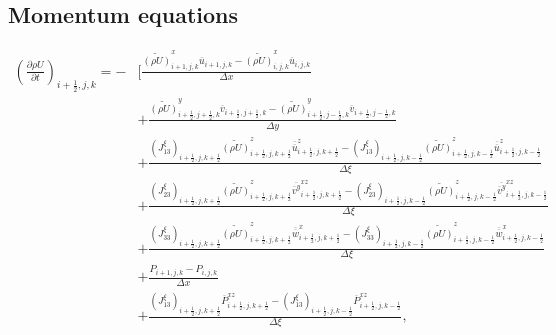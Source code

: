 \subsection{Momentum equations}
\begin{align}
 \left(\frac{\partial \rho U}{\partial t}\right)_{i+\frac{1}{2},j,k}
 = - &\Bigg[ \frac{ \widetilde{(\rho U)}^x_{i+1,j,k} \overline{u}_{i+1,j,k}
                  - \widetilde{(\rho U)}^x_{i  ,j,k} \overline{u}_{i  ,j,k}
                  } {\Delta x} \nonumber \\
          &+ \frac{ \widetilde{(\rho U)}^y_{i+\frac{1}{2},j+\frac{1}{2},k} \overline{v}_{i+\frac{1}{2},j+\frac{1}{2},k}
                  - \widetilde{(\rho U)}^y_{i+\frac{1}{2},j-\frac{1}{2},k} \overline{v}_{i+\frac{1}{2},j-\frac{1}{2},k}
                  } {\Delta y} \nonumber \\
          &+ \frac{ (J^{\xi}_{13})_{i+\frac{1}{2},j,k+\frac{1}{2}} \widetilde{(\rho U)}^z_{i+\frac{1}{2},j,k+\frac{1}{2}} \overline{\overline{u}}^z_{i+\frac{1}{2},j,k+\frac{1}{2}}
                  - (J^{\xi}_{13})_{i+\frac{1}{2},j,k-\frac{1}{2}} \widetilde{(\rho U)}^z_{i+\frac{1}{2},j,k-\frac{1}{2}} \overline{\overline{u}}^z_{i+\frac{1}{2},j,k-\frac{1}{2}}
                  } {\Delta \xi} \nonumber \\
          &+ \frac{ (J^{\xi}_{23})_{i+\frac{1}{2},j,k+\frac{1}{2}} \widetilde{(\rho U)}^z_{i+\frac{1}{2},j,k+\frac{1}{2}} \overline{\overline{v}^y}^{xz}_{i+\frac{1}{2},j,k+\frac{1}{2}}
                  - (J^{\xi}_{23})_{i+\frac{1}{2},j,k-\frac{1}{2}} \widetilde{(\rho U)}^z_{i+\frac{1}{2},j,k-\frac{1}{2}} \overline{\overline{v}^y}^{xz}_{i+\frac{1}{2},j,k-\frac{1}{2}}
                  } {\Delta \xi} \nonumber \\
          &+ \frac{ (J^{\xi}_{33})_{i+\frac{1}{2},j,k+\frac{1}{2}} \widetilde{(\rho U)}^z_{i+\frac{1}{2},j,k+\frac{1}{2}} \overline{\overline{w}}^x_{i+\frac{1}{2},j,k+\frac{1}{2}}
                  - (J^{\xi}_{33})_{i+\frac{1}{2},j,k-\frac{1}{2}} \widetilde{(\rho U)}^z_{i+\frac{1}{2},j,k-\frac{1}{2}} \overline{\overline{w}}^x_{i+\frac{1}{2},j,k-\frac{1}{2}}
                  } {\Delta \xi} \nonumber \\
          &+ \frac{ P_{i+1,j,k}-P_{i,j,k}}{\Delta x} \nonumber \\
          &+ \frac{ (J^{\xi}_{13})_{i+\frac{1}{2},j,k+\frac{1}{2}} \overline{P}^{xz}_{i+\frac{1}{2},j,k+\frac{1}{2}}
                  - (J^{\xi}_{13})_{i+\frac{1}{2},j,k-\frac{1}{2}} \overline{P}^{xz}_{i+\frac{1}{2},j,k-\frac{1}{2}}
                  } {\Delta \xi},
\end{align}


